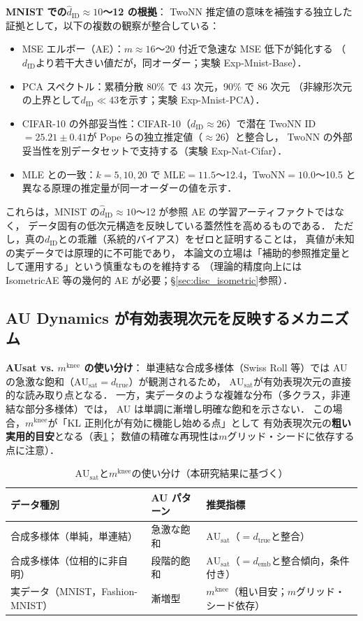 \documentclass[11pt,a4paper]{jsarticle}
\newcommand{\dtrue}{d_{\mathrm{true}}}
\newcommand{\AUsat}{\mathrm{AU}_{\mathrm{sat}}}
\newcommand{\mknee}{m^{\mathrm{knee}}}
\newcommand{\demb}{d_{\mathrm{emb}}}
\begin{document}
\textbf{MNIST での$\hat{d}_\mathrm{ID} \approx 10$〜12 の根拠}：
TwoNN 推定値の意味を補強する独立した証拠として，以下の複数の観察が整合している：
\begin{itemize}
  \item MSE エルボー（AE）：$m \approx 16$〜20 付近で急速な MSE 低下が鈍化する
        （$d_\mathrm{ID}$より若干大きい値だが，同オーダー；実験 Exp-Mnist-Base）．
  \item PCA スペクトル：累積分散 80\% で 43 次元，90\% で 86 次元
        （非線形次元の上界として$d_\mathrm{ID} \ll 43$を示す；実験 Exp-Mnist-PCA）．
  \item CIFAR-10 の外部妥当性：CIFAR-10（$d_\mathrm{ID} \approx 26$）で潜在 TwoNN ID$=25.21\pm0.41$が
        Pope ら\cite{pope2021intrinsic}の独立推定値（$\approx26$）と整合し，
        TwoNN の外部妥当性を別データセットで支持する（実験 Exp-Nat-Cifar）．
  \item MLE との一致：$k=5,10,20$ で MLE$=11.5$〜12.4，TwoNN$=10.0$〜10.5 と
        異なる原理の推定量が同一オーダーの値を示す．
\end{itemize}
これらは，MNIST の$\hat{d}_\mathrm{ID} \approx 10$〜12 が参照 AE の学習アーティファクトではなく，
データ固有の低次元構造を反映している蓋然性を高めるものである．
ただし，真の$d_\mathrm{ID}$との乖離（系統的バイアス）をゼロと証明することは，
真値が未知の実データでは原理的に不可能であり，
本論文の立場は「補助的参照推定量として運用する」という慎重なものを維持する
（理論的精度向上には IsometricAE 等の幾何的 AE が必要；§\ref{sec:disc_isometric}参照）．

\subsection{AU Dynamics が有効表現次元を反映するメカニズム}\label{sec:disc_au_dynamics}

\textbf{AUsat vs. $\mknee$ の使い分け}：
単連結な合成多様体（Swiss Roll 等）では AU の急激な飽和（$\AUsat = \dtrue$）が観測されるため，
$\AUsat$が有効表現次元の直接的な読み取り点となる．
一方，実データのような複雑な分布（多クラス，非連結な部分多様体）では，
AU は単調に漸増し明確な飽和を示さない．
この場合，$\mknee$が「KL 正則化が有効に機能し始める点」として
有効表現次元の\textbf{粗い実用的目安}となる（表\ref{tab:au_comparison}；
数値の精確な再現性は$m$グリッド・シードに依存する点に注意）．

\begin{table}[H]
\centering
\caption{$\AUsat$と$\mknee$の使い分け（本研究結果に基づく）}
\label{tab:au_comparison}
\small
\begin{tabular}{lll}
\toprule
データ種別 & AU パターン & 推奨指標 \\
\midrule
合成多様体（単純，単連結） & 急激な飽和 & $\AUsat$（$= \dtrue$と整合） \\
合成多様体（位相的に非自明） & 段階的飽和 & $\AUsat$（$= \demb$と整合傾向，条件付き） \\
実データ（MNIST，Fashion-MNIST） & 漸増型 & $\mknee$（粗い目安；$m$グリッド・シード依存） \\
\bottomrule
\end{tabular}
\end{table}
\end{document}
